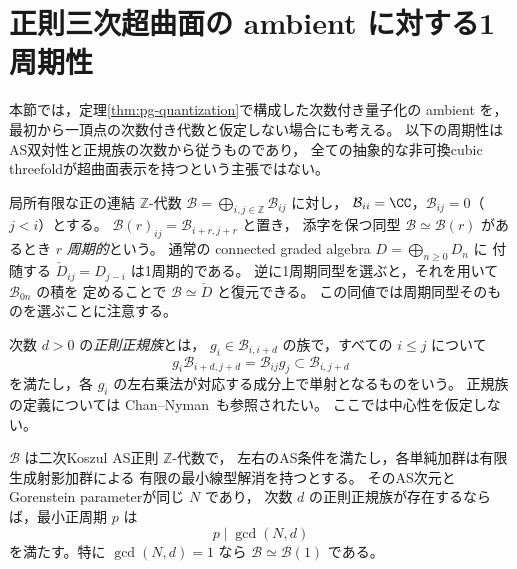 \section{正則三次超曲面の ambient に対する1周期性}\label{sec:pg-ambient-periodicity}
本節では，定理\ref{thm:pg-quantization}で構成した次数付き量子化の ambient を，
最初から一頂点の次数付き代数と仮定しない場合にも考える。
以下の周期性はAS双対性と正規族の次数から従うものであり，
全ての抽象的な非可換cubic threefoldが超曲面表示を持つという主張ではない。

局所有限な正の連結 $\mathbb Z$-代数
$\mathcal B=\bigoplus_{i,j\in\mathbb Z}\mathcal B_{ij}$ に対し，
$\mathcal B_{ii}=\CC$，$\mathcal B_{ij}=0$（$j<i$）とする。
$\mathcal B(r)_{ij}=\mathcal B_{i+r,j+r}$ と置き，
添字を保つ同型 $\mathcal B\simeq\mathcal B(r)$ があるとき
$r$ \emph{周期的}という。
通常の connected graded algebra $D=\bigoplus_{n\geq0}D_n$ に
付随する $\check D_{ij}=D_{j-i}$ は1周期的である。
逆に1周期同型を選ぶと，それを用いて $\mathcal B_{0n}$ の積を
定めることで $\mathcal B\simeq\check D$ と復元できる。
この同値では周期同型そのものを選ぶことに注意する。

次数 $d>0$ の\emph{正則正規族}とは，
$g_i\in\mathcal B_{i,i+d}$ の族で，すべての $i\leq j$ について
\begin{equation}\label{eq:pg-ambient-normal-family}
 g_i\mathcal B_{i+d,j+d}
 =\mathcal B_{ij}g_j\subset\mathcal B_{i,j+d}
\end{equation}
を満たし，各 $g_i$ の左右乗法が対応する成分上で単射となるものをいう。
正規族の定義については
Chan--Nyman~\cite[Definition~8.6]{PChanNymanNormalFamily}も参照されたい。
ここでは中心性を仮定しない。

\begin{theorem}\label{thm:pg-ambient-gcd}
$\mathcal B$ は二次Koszul AS正則 $\mathbb Z$-代数で，
左右のAS条件を満たし，各単純加群は有限生成射影加群による
有限の最小線型解消を持つとする。
そのAS次元とGorenstein parameterが同じ $N$ であり，
次数 $d$ の正則正規族が存在するならば，最小正周期 $p$ は
\begin{equation}
 p\mid\gcd(N,d)
\end{equation}
を満たす。特に $\gcd(N,d)=1$ なら
$\mathcal B\simeq\mathcal B(1)$ である。
\end{theorem}

